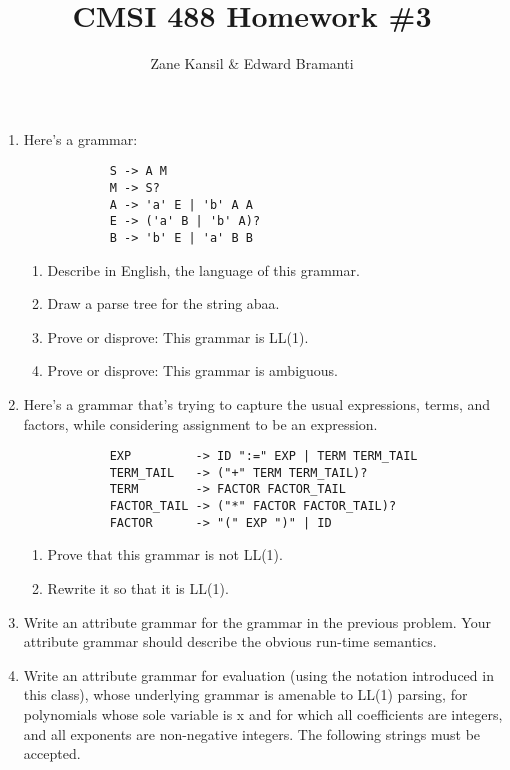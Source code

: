 \documentclass{article}
\begin{document}
\title{CMSI 488 Homework \#3}
\author{Zane Kansil \& Edward Bramanti}
\maketitle
\begin{enumerate}
    \item Here's a grammar:
        \begin{verbatim}
            S -> A M
            M -> S?
            A -> 'a' E | 'b' A A
            E -> ('a' B | 'b' A)?
            B -> 'b' E | 'a' B B
        \end{verbatim}
        \begin{enumerate}
            \item Describe in English, the language of this grammar.
            \item Draw a parse tree for the string abaa.
            \item Prove or disprove: This grammar is LL(1).
            \item Prove or disprove: This grammar is ambiguous.
        \end{enumerate}
    \pagebreak
    \item Here's a grammar that's trying to capture the usual expressions, terms, and factors, while considering assignment to be an expression.
        \begin{verbatim}
            EXP         -> ID ":=" EXP | TERM TERM_TAIL
            TERM_TAIL   -> ("+" TERM TERM_TAIL)?
            TERM        -> FACTOR FACTOR_TAIL
            FACTOR_TAIL -> ("*" FACTOR FACTOR_TAIL)?
            FACTOR      -> "(" EXP ")" | ID
        \end{verbatim}
        \begin{enumerate}
            \item Prove that this grammar is not LL(1).
            \item Rewrite it so that it is LL(1).
        \end{enumerate}
    \pagebreak
    \item Write an attribute grammar for the grammar in the previous problem. Your attribute grammar should describe the obvious run-time semantics.
        
    \pagebreak
    \item Write an attribute grammar for evaluation (using the notation introduced in this class), whose underlying grammar is amenable to LL(1) parsing, for polynomials whose sole variable is x and for which all coefficients are integers, and all exponents are non-negative integers. The following strings must be accepted.

\end{enumerate}
\end{document}
